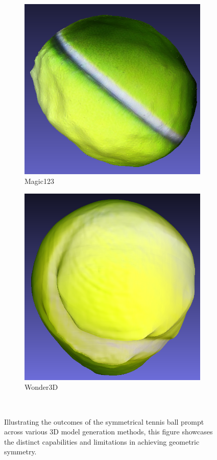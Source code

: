 \begin{figure}[ht]
    \begin{subfigure}[b]{0.22\textwidth}
        \centering
        \includegraphics[width=\textwidth]{etc/a symmetrical tennis ball/magic123/magic123_ball_result.png}
        \caption{Magic123}
    \end{subfigure}
    \begin{subfigure}[b]{0.2\textwidth}
        \centering
        \includegraphics[width=\textwidth]{etc/a symmetrical tennis ball/wonder3D/wonder3d_ball_result.png}
        \caption{Wonder3D}
    \end{subfigure}
    \caption{Illustrating the outcomes of the symmetrical tennis ball prompt across various 3D model generation methods, this figure showcases the distinct capabilities and limitations in achieving geometric symmetry. }~\label{fig:Ball}
\end{figure}



